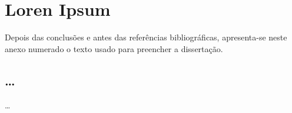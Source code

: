 \chapter{Loren Ipsum} \label{ap1:loren}

Depois das conclusões e antes das referências bibliográficas,
apresenta-se neste anexo numerado o texto usado para preencher a
dissertação.

\section{\dots}

\dots